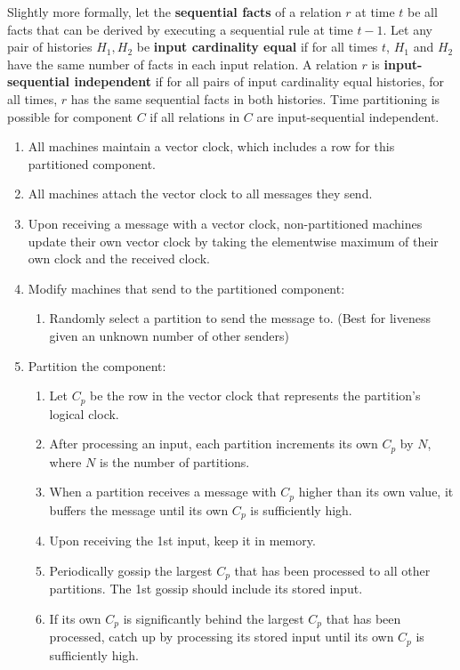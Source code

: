 \documentclass{article}
\begin{document}
Slightly more formally, let the \textbf{sequential facts} of a relation $r$ at time $t$ be all facts that can be derived by executing a sequential rule at time $t-1$.
Let any pair of histories $H_1, H_2$ be \textbf{input cardinality equal} if for all times $t$, $H_1$ and $H_2$ have the same number of facts in each input relation.
A relation $r$ is \textbf{input-sequential independent} if for all pairs of input cardinality equal histories, for all times, $r$ has the same sequential facts in both histories.
Time partitioning is possible for component $C$ if all relations in $C$ are input-sequential independent.

\begin{enumerate}
  \item All machines maintain a vector clock, which includes a row for this partitioned component.
  \item All machines attach the vector clock to all messages they send.
  \item Upon receiving a message with a vector clock, non-partitioned machines update their own vector clock by taking the elementwise maximum of their own clock and the received clock.
  \item Modify machines that send to the partitioned component:
    \begin{enumerate}
      \item Randomly select a partition to send the message to. (Best for liveness given an unknown number of other senders)
    \end{enumerate}
  \item Partition the component:
    \begin{enumerate}
      \item Let $C_p$ be the row in the vector clock that represents the partition's logical clock.
      \item After processing an input, each partition increments its own $C_p$ by $N$, where $N$ is the number of partitions.
      \item When a partition receives a message with $C_p$ higher than its own value, it buffers the message until its own $C_p$ is sufficiently high.
      \item Upon receiving the 1st input, keep it in memory.
      \item Periodically gossip the largest $C_p$ that has been processed to all other partitions. The 1st gossip should include its stored input.
      \item If its own $C_p$ is significantly behind the largest $C_p$ that has been processed, catch up by processing its stored input until its own $C_p$ is sufficiently high.
    \end{enumerate}
\end{enumerate}
\end{document}
